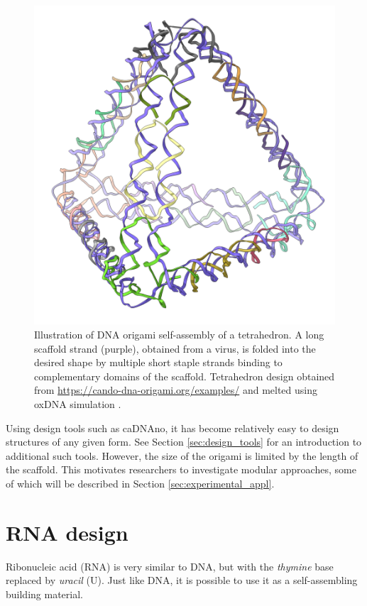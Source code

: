 \begin{figure}
    \centering\includegraphics[width=\textwidth/3]{figures/melt/assembled.png}
    \caption{Illustration of DNA origami self-assembly of a tetrahedron. A long scaffold strand (purple), obtained from a virus, is folded into the desired shape by multiple short staple strands binding to complementary domains of the scaffold. Tetrahedron design obtained from \url{https://cando-dna-origami.org/examples/} and melted using oxDNA simulation \cite{ouldridge2010dna}.
    }
    \label{fig:dnaOrigami}
\end{figure}

Using design tools such as caDNAno\cite{cadnano}, it has become relatively easy to design structures of any given form. See Section \ref{sec:design_tools} for an introduction to additional such tools. However, the size of the origami is limited by the length of the scaffold. This motivates researchers to investigate modular approaches, some of which will be described in Section \ref{sec:experimental_appl}.

\section{RNA design}
\label{sec:RNA_design}
Ribonucleic acid (RNA) is very similar to DNA, but with the \emph{thymine} base replaced by \emph{uracil} (U). Just like DNA, it is possible to use it as a self-assembling building material.

